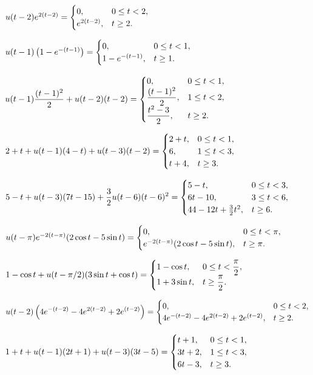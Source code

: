  $u(t-2)e^{2(t-2)}=
\displaystyle{\begin{cases} 0,&0\le t<2, \\
e^{2(t-2)},&t\ge2.\end{cases}}$

 $u(t-1)\left(1-e^{-(t-1)}\right)=
\displaystyle{\begin{cases} 0,&0\le t<1,\\
1-e^{-(t-1)},&t\ge1.\end{cases}}$

 $\displaystyle{u(t-1)\frac{(t-1)^2}{2}+u(t-2)(t-2)}=
\displaystyle{\begin{cases} 0,&0 \le t<1,\\
\dfrac{(t-1)^2}{2},&1\le t<2,\\
\dfrac{t^2-3}{2},&t\ge2.\end{cases}}$

 $2+t+u(t-1)(4-t)+u(t-3)(t-2)= \displaystyle{
\begin{cases} 2+t,& 0\le t<1,\\
6,&1\le t<3,\\
t+4,&t\ge 3.\end{cases}}$

 $\displaystyle{5-t+u(t-3)(7t-15)+ \frac{3}{2}
u(t-6)(t-6)^2}= \displaystyle{\begin{cases} 5-t,&0\le t<3,\\
6t-10,&3\le t<6,\\
44-12t+\frac{3}{2}t^2, &t\ge6.
\end{cases}}$

 $u(t-\pi)e^{-2(t-\pi)} (2\cos t- 5\sin t)=
\displaystyle{\begin{cases} 0, &0\le t<\pi,\\
e^{-2(t-\pi)}(2\cos t-5\sin t),&t\ge\pi.\end{cases}}$

 $\displaystyle{1-\cos t+ u(t-\pi/2) (3\sin t+\cos t)}=
\displaystyle{\begin{cases} 1-\cos t,&0\le t<\dfrac{\pi}{2},\\
1+3\sin t,&t\ge \dfrac{\pi}{2}.\end{cases}}$

 $\displaystyle{u(t-2)\left
(4e^{-(t-2)}-4e^{2(t-2)}+2e^{(t-2)}\right)}=
\displaystyle{\begin{cases} 0,&0\le t<2,\\
4e^{-(t-2)}-4e^{2(t-2)}+2e^{(t-2)},&t\ge2.\end{cases}}$

 $\displaystyle{1+t+u(t-1)(2t+1)+u(t-3)(3t-5)}= \displaystyle{
\begin{cases} t+1,&0\le t<1,\\
3t+2,&1\le t<3,\\
6t-3,&t\ge3.\end{cases}}$

